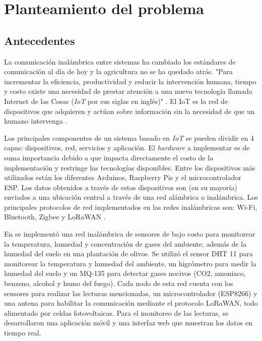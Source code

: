 \section{Planteamiento del problema}

\subsection{Antecedentes}

La comunicación inalámbrica entre sistemas ha cambiado los estándares de comunicación al día de hoy y la agricultura no se ha quedado atrás. "Para incrementar la eficiencia, productividad y reducir la intervención humana, tiempo y costo existe una necesidad de prestar atención a una nueva tecnología llamada Internet de las Cosas (\textit{IoT} por sus siglas en inglés)" \cite{agriculture_automation_review}. El IoT es la red de dispositivos que adquieren y actúan sobre información sin la necesidad de que un humano intervenga \cite{agriculture_automation_review}. 

Los principales componentes de un sistema basado en \textit{IoT} se pueden dividir en 4 capas: dispositivos, red, servicios y aplicación. El \textit{hardware} a implementar es de suma importancia debido a que impacta directamente el costo de la implementación y restringe las tecnologías disponibles. Entre los dispositivos más utilizados están los diferentes Arduinos, Raspberry Pis y el microcontrolador ESP. Los datos obtenidos a través de estos dispositivos son (en su mayoría) enviados a una ubicación central a través de una red alámbrica o inalámbrica. Los principales protocolos de red implementados en las redes inalámbricas son: Wi-Fi, Bluetooth, Zigbee y LoRaWAN \cite{systematicreviewiot}. 

En \cite{olive_orchard_monitorization} se implementó una red inalámbrica de sensores de bajo costo para monitorear la temperatura, humedad y concentración de gases del ambiente, además de la humedad del suelo en una plantación de olivos. Se utilizó el sensor DHT 11 para monitorear la temperatura y humedad del ambiente, un higrómetro para medir la humedad del suelo y un MQ-135 para detectar gases nocivos (CO2, amoniaco, benzeno, alcohol y humo del fuego). Cada nodo de esta red cuenta con los sensores para realizar las lecturas mencionadas, un microcontrolador (ESP8266) y una antena para habilitar la comunicación mediante el protocolo LoRaWAN, todo alimentado por celdas fotovoltaicas. Para el monitoreo de las lecturas, se desarrollaron una aplicación móvil y una interfaz web que muestran los datos en tiempo real.

